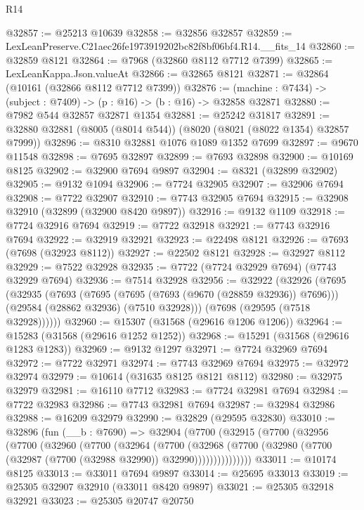\begin{lexlean}{R14}
\begin{coremodule}
@32857 := @25213 @10639
@32858 := @32856 @32857
@32859 := LexLeanPreserve.C21aec26fe1973919202bc82f8bf06bf4.R14.__fits_14
@32860 := @32859 @8121
@32864 := @7968 (@32860 @8112 @7712 @7399)
@32865 := LexLeanKappa.Json.valueAt
@32866 := @32865 @8121
@32871 := @32864 (@10161 (@32866 @8112 @7712 @7399))
@32876 := (machine : @7434) -> (subject : @7409) -> (p : @16) -> (b : @16) -> @32858 @32871
@32880 := @7982 @544 @32857 @32871 @1354
@32881 := @25242 @31817
@32891 := @32880 @32881 (@8005 (@8014 @544)) (@8020 (@8021 (@8022 @1354) @32857 @7999))
@32896 := @8310 @32881 @1076 @1089 @1352 @7699
@32897 := @9670 @11548
@32898 := @7695 @32897
@32899 := @7693 @32898
@32900 := @10169 @8125
@32902 := @32900 @7694 @9897
@32904 := @8321 (@32899 @32902)
@32905 := @9132 @1094
@32906 := @7724 @32905
@32907 := @32906 @7694
@32908 := @7722 @32907
@32910 := @7743 @32905 @7694
@32915 := @32908 @32910 (@32899 (@32900 @8420 @9897))
@32916 := @9132 @1109
@32918 := @7724 @32916 @7694
@32919 := @7722 @32918
@32921 := @7743 @32916 @7694
@32922 := @32919 @32921
@32923 := @22498 @8121
@32926 := @7693 (@7698 (@32923 @8112))
@32927 := @22502 @8121
@32928 := @32927 @8112
@32929 := @7522 @32928
@32935 := @7722 (@7724 @32929 @7694) (@7743 @32929 @7694)
@32936 := @7514 @32928
@32956 := @32922
    (@32926
      (@7695
        (@32935
          (@7693
            (@7695 (@7695 (@7693 (@9670 (@28859 @32936)) @7696)))
            (@29584 (@28862 @32936) (@7510 @32928)))
          (@7698 (@29595 (@7518 @32928))))))
@32960 := @15307 (@31568 (@29616 @1206 @1206))
@32964 := @15283 (@31568 (@29616 @1252 @1252))
@32968 := @15291 (@31568 (@29616 @1283 @1283))
@32969 := @9132 @1297
@32971 := @7724 @32969 @7694
@32972 := @7722 @32971
@32974 := @7743 @32969 @7694
@32975 := @32972 @32974
@32979 := @10614 (@31635 @8125 @8121 @8112)
@32980 := @32975 @32979
@32981 := @16110 @7712
@32983 := @7724 @32981 @7694
@32984 := @7722 @32983
@32986 := @7743 @32981 @7694
@32987 := @32984 @32986
@32988 := @16209 @32979
@32990 := @32829 (@29595 @32830)
@33010 := @32896
    (fun (__b : @7690) =>
    @32904
      (@7700
        (@32915
          (@7700
            (@32956
              (@7700
                (@32960
                  (@7700
                    (@32964
                      (@7700
                        (@32968
                          (@7700
                            (@32980 (@7700 (@32987 (@7700 (@32988 @32990)) @32990)))))))))))))))
@33011 := @10174 @8125
@33013 := @33011 @7694 @9897
@33014 := @25695 @33013
@33019 := @25305 @32907 @32910 (@33011 @8420 @9897)
@33021 := @25305 @32918 @32921
@33023 := @25305 @20747 @20750

\end{coremodule}
\end{lexlean}
